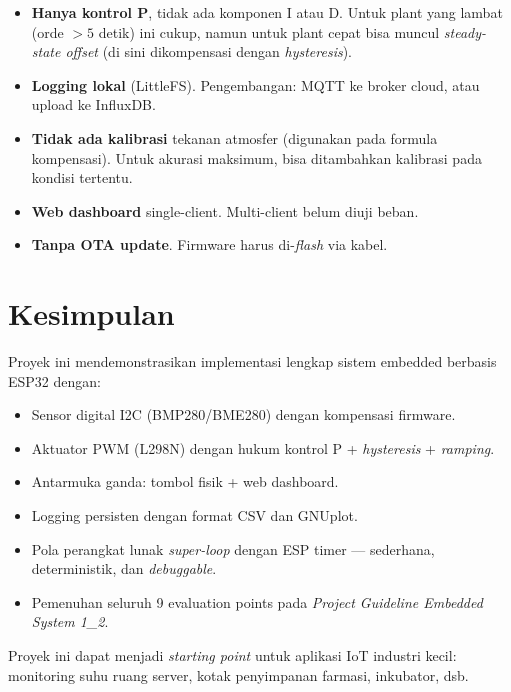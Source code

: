 \documentclass[11pt,a4paper]{article}
\begin{document}
\begin{itemize}
    \item \textbf{Hanya kontrol P}, tidak ada komponen I atau D. Untuk plant yang lambat (orde $>5$ detik) ini cukup, namun untuk plant cepat bisa muncul \emph{steady-state offset} (di sini dikompensasi dengan \emph{hysteresis}).
    \item \textbf{Logging lokal} (LittleFS). Pengembangan: MQTT ke broker cloud, atau upload ke InfluxDB.
    \item \textbf{Tidak ada kalibrasi} tekanan atmosfer (digunakan pada formula kompensasi). Untuk akurasi maksimum, bisa ditambahkan kalibrasi pada kondisi tertentu.
    \item \textbf{Web dashboard} single-client. Multi-client belum diuji beban.
    \item \textbf{Tanpa OTA update}. Firmware harus di-\emph{flash} via kabel.
\end{itemize}

\section{Kesimpulan}

Proyek ini mendemonstrasikan implementasi lengkap sistem embedded berbasis ESP32 dengan:
\begin{itemize}
    \item Sensor digital I2C (BMP280/BME280) dengan kompensasi firmware.
    \item Aktuator PWM (L298N) dengan hukum kontrol P + \emph{hysteresis} + \emph{ramping}.
    \item Antarmuka ganda: tombol fisik + web dashboard.
    \item Logging persisten dengan format CSV dan GNUplot.
    \item Pola perangkat lunak \emph{super-loop} dengan ESP timer --- sederhana, deterministik, dan \emph{debuggable}.
    \item Pemenuhan seluruh 9 evaluation points pada \emph{Project Guideline Embedded System 1\_2}.
\end{itemize}

Proyek ini dapat menjadi \emph{starting point} untuk aplikasi IoT industri kecil: monitoring suhu ruang server, kotak penyimpanan farmasi, inkubator, dsb.

\appendix
\end{document}
